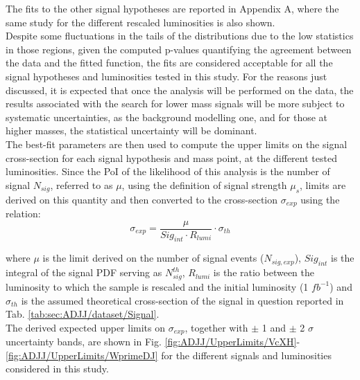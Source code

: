 \noindent The fits to the other signal hypotheses are reported in Appendix A, where the same study for the different rescaled luminosities is also shown.\\
Despite some fluctuations in the tails of the distributions due to the low statistics in those regions, given the computed p-values quantifying the agreement between the data and the fitted function, the fits are considered acceptable for all the signal hypotheses and luminosities tested in this study.
For the reasons just discussed, it is expected that once the analysis will be performed on the data, the results associated with the search for lower mass signals will be more subject to systematic uncertainties, as the background modelling one, and for those at higher masses, the statistical uncertainty will be dominant.\\
The best-fit parameters are then used to compute the upper limits on the signal cross-section for each signal hypothesis and mass point, at the different tested luminosities.
Since the PoI of the likelihood of this analysis is the number of signal $N_{sig}$, referred to as $\mu$, using the definition of signal strength $\mu_s$, limits are derived on this quantity and then converted to the cross-section $\sigma_{exp}$ using the relation:
\begin{equation}\label{eq:ADJJ/UpperLimits/sigma_limit}
  \sigma_{exp} = \frac{\mu}{Sig_{int} \cdot R_{lumi}}\cdot \sigma_{th}
\end{equation}

\noindent where $\mu$ is the limit derived on the number of signal events ($N_{sig,exp}$), $Sig_{int}$ is the integral of the signal PDF serving as $N^{th}_{sig}$, $R_{lumi}$ is the ratio between the luminosity to which the sample is rescaled and the initial luminosity (1 $fb^{-1}$) and $\sigma_{th}$ is the assumed theoretical cross-section of the signal in question reported in Tab. \ref{tab:sec:ADJJ/dataset/Signal}.\\
The derived expected upper limits on $\sigma_{exp}$, together with $\pm$ 1 and $\pm$ 2 $\sigma$ uncertainty bands, are shown in Fig. \ref{fig:ADJJ/UpperLimits/VcXH}-\ref{fig:ADJJ/UpperLimits/WprimeDJ} for the different signals and luminosities considered in this study.

